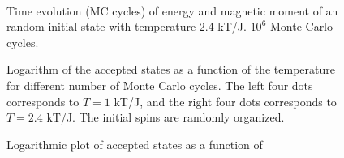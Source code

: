 \documentclass{emulateapj}
\begin{document}
\begin{figure}[t]
\\
\caption{Time evolution (MC cycles) of energy and magnetic moment of an random initial state with temperature 2.4 kT/J. $10^6$ Monte Carlo cycles.}
\end{figure}

\begin{figure}[t]
\mbox{}
\caption{Logarithm of the accepted states as a function of the temperature for different number of Monte Carlo cycles. The left four dots corresponds to $T=1$ kT/J, and the right four dots corresponds to $T=2.4$ kT/J. The initial spins are randomly organized.}
\label{fig:logAccepts(t)}
\end{figure}

\begin{figure}[t]
\mbox{}
\caption{Logarithmic plot of accepted states as a function of }
\label{fig:logAccepts}
\end{figure}
\end{document}
